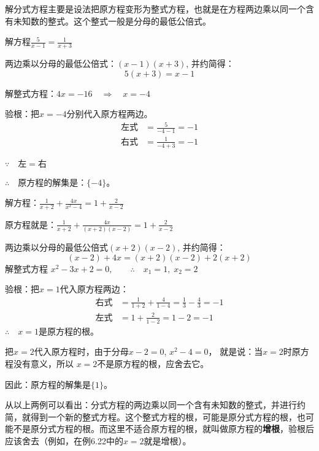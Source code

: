 解分式方程主要是设法把原方程变形为整式方程，也就是在方程两边乘以同一个含有未知数的整式。这个整式一般是分母的最低公倍式。



\begin{example}
 解方程$\frac{5}{x-1}=\frac{1}{x+3}$  
\end{example}

\begin{solution}
两边乘以分母的最低公倍式：$(x-1)(x+3)$, 并约简得：
\[5(x+3)=x-1\]

解整式方程：$4x=-16\quad \Rightarrow\quad x=-4$

验根：把$x=-4$分别代入原方程两边。
\[\begin{split}
    \text{左式}&=\frac{5}{-4-1}=-1\\
    \text{右式}&=\frac{1}{-4+3}=-1  
\end{split}\]

$\because\quad \text{左}=\text{右}$

$\therefore\quad $原方程的解集是：$\{-4\}$。
\end{solution}


\begin{example}
解方程：$\frac{1}{x+2}+\frac{4x}{x^2-4}=1+\frac{2}{x-2}$
\end{example}

\begin{solution}
    原方程就是：$\frac{1}{x+2}+\frac{4x}{(x+2)(x-2)}=1+\frac{2}{x-2}$

    两边乘以分母的最低公倍式$(x+2)(x-2)$, 并约简得：
    \[(x-2)+4x=(x+2)(x-2)+2(x+2)\]
    解整式方程 $x^2-3x+2=0,\qquad \therefore\quad x_1=1,\;x_2=2$
    
    验根：把$x=1$代入原方程两边：
    \[\begin{split}
        \text{右式}&=\frac{1}{1+2}+\frac{4}{1-4}=\frac{1}{3}-\frac{4}{3}=-1\\
        \text{左式}&=1+\frac{2}{1-2}=1-2=-1
    \end{split}\]
    $\therefore\quad x=1$是原方程的根。

    把$x=2$代入原方程时，由于分母$x-2=0$, $x^2-4=0$，
    就是说：当$x=2$时原方程没有意义，所以 $x=2$不是原方程的根，应舍去它。

因此：原方程的解集是$\{1\}$。
\end{solution}

从以上两例可以看出：分式方程的两边乘以同一个含有未知数的整式，并进行约简，就得到一个新的整式方程。这个整式方程的根，可能是原分式方程的根，也可能不是原分式方程的根。而这里不适合原方程的根，就叫做原方程的\textbf{增根}，验根后应该舍去（例如，在例6.22中的$x=2$就是增根）。

